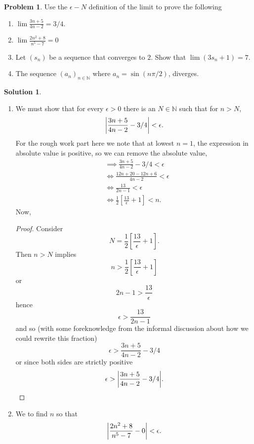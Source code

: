 \documentclass[10pt]{article}
\theoremstyle{definition}
\newtheorem{problem}{Problem}
\newtheorem{soln}{Solution}
\begin{document}
\begin{problem}
Use the $\epsilon-N$ definition of the limit to prove the following
\begin{enumerate}[label=(\alph*)]
  \item $\lim \frac{3n+5}{4n-2}=3/4$.
  \item $\lim\frac{2n^2+8}{n^5-7}=0$
  \item Let $(s_n)$ be a sequence that converges to $2$. Show that $\lim(3s_n+1)=7$.
  \item The sequence $(a_n)_{n\in\mathbb{N}}$ where $a_n=\sin(n\pi/2)$, diverges.
\end{enumerate}
\end{problem}
\begin{soln}
  \begin{enumerate}[label=(\alph*)]
    \item We must show that for every $\epsilon >0$ there is an $N\in \mathbb{N}$ such that for $n>N$,
          $$\abs{\frac{3n+5}{4n-2}-3/4}<\epsilon.$$
          For the rough work part here we note that at lowest $n=1$, the expression in absolute value is positive, so we can remove the
          absolute value,
          \begin{align*}
             & \implies \frac{3n+5}{4n-2}-3/4<\epsilon                           \\
             & \Leftrightarrow  \frac{12n+20-12n+6}{4n-2}<\epsilon               \\
             & \Leftrightarrow  \frac{13}{2n-1}<\epsilon                         \\
             & \Leftrightarrow  \frac{1}{2}\left[\frac{13}{\epsilon}+1\right]<n.
          \end{align*}
          Now,
          \begin{proof}
            Consider
            $$N=\frac{1}{2}\left[\frac{13}{\epsilon}+1\right].$$
            Then $n> N$ implies
            $$n>\frac{1}{2}\left[\frac{13}{\epsilon}+1\right]$$
            or
            $$2n-1>\frac{13}{\epsilon}$$
            hence
            $$\epsilon>\frac{13}{2n-1}$$
            and so (with some foreknowledge from the informal discussion about how we could rewrite this fraction)
            $$\epsilon>\frac{3n+5}{4n-2}-3/4$$
            or since both sides are strictly positive
            $$\epsilon>\abs{\frac{3n+5}{4n-2}-3/4}.$$
            \qedhere
          \end{proof}
    \item We to find $n$ so that
          $$\abs{\frac{2n^2+8}{n^5-7}-0}<\epsilon.$$

\end{enumerate}
\end{soln}
\end{document}
